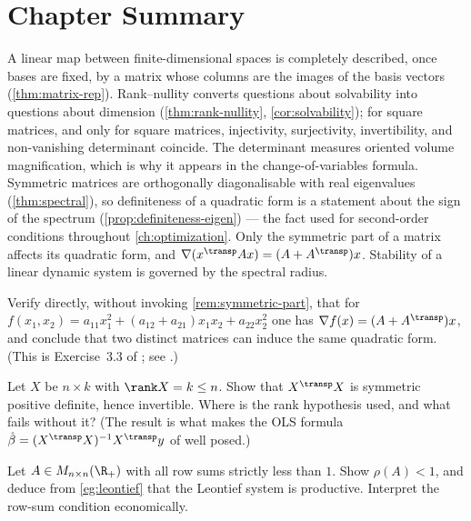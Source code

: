 \section{Chapter Summary}\label{sec:lin-summary}

A linear map between finite-dimensional spaces is completely described, once
bases are fixed, by a matrix whose columns are the images of the basis vectors
(\autoref{thm:matrix-rep}). Rank--nullity converts questions about solvability
into questions about dimension (\autoref{thm:rank-nullity},
\autoref{cor:solvability}); for square matrices, and only for square matrices,
injectivity, surjectivity, invertibility, and non-vanishing determinant coincide.
The determinant measures oriented volume magnification, which is why it appears
in the change-of-variables formula. Symmetric matrices are orthogonally
diagonalisable with real eigenvalues (\autoref{thm:spectral}), so definiteness of
a quadratic form is a statement about the sign of the spectrum
(\autoref{prop:definiteness-eigen}) --- the fact used for second-order conditions
throughout \autoref{ch:optimization}. Only the symmetric part of a matrix affects
its quadratic form, and $\nabla(x^{\transp}Ax)=(A+A^{\transp})x$. Stability of a
linear dynamic system is governed by the spectral radius.

\begin{exercise}\label{ex:lin-1}
	Verify directly, without invoking \autoref{rem:symmetric-part}, that for
	$f(x_1,x_2)=a_{11}x_1^2+(a_{12}+a_{21})x_1x_2+a_{22}x_2^2$ one has
	$\nabla f(x)=(A+A^{\transp})x$, and conclude that two distinct matrices can
	induce the same quadratic form. (This is Exercise~3.3 of
	\textcite{fukuda2026notes}; see \autocite[slide 49]{fukuda2026calculus}.)
\end{exercise}

\begin{exercise}\label{ex:lin-2}
	Let $X$ be $n\times k$ with $\rank X=k\leq n$. Show that $X^{\transp}X$ is
	symmetric positive definite, hence invertible. Where is the rank hypothesis
	used, and what fails without it? (The result is what makes the OLS formula
	$\hat\beta=(X^{\transp}X)^{-1}X^{\transp}y$ of
	\autocite[slide 60]{fukuda2026calculus} well posed.)
\end{exercise}

\begin{exercise}\label{ex:lin-3}
	Let $A\in M_{n\times n}(\R_+)$ with all row sums strictly less than $1$. Show
	$\rho(A)<1$, and deduce from \autoref{eg:leontief} that the Leontief system is
	productive. Interpret the row-sum condition economically.
\end{exercise}
